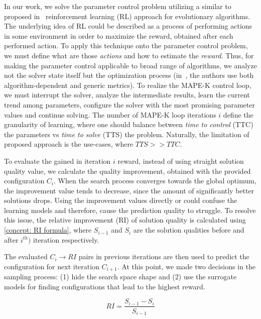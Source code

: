 In our work, we solve the parameter control problem utilizing a similar to proposed in~\cite{karafotias2014generic} reinforcement learning (RL) approach for evolutionary algorithms.
The underlying idea of RL could be described as a process of performing actions in some environment in order to maximize the reward, obtained after each performed action. To apply this technique onto the parameter control problem, we must define what are those \emph{actions} and how to estimate the \emph{reward}. Thus, for making the parameter control applicable to broad range of algorithms, we analyze not the solver state itself but the optimization process (in~\cite{karafotias2014generic}, the authors use both algorithm-dependent and generic metrics). To realize the MAPE-K control loop, we must interrupt the solver, analyze the intermediate results, learn the current trend among parameters, configure the solver with the most promising parameter values and continue solving. The number of MAPE-K loop iterations $i$ define the granularity of learning, where one should balance between \emph{time to control} (TTC) the parameters vs \emph{time to solve} (TTS) the problem. Naturally, the limitation of proposed approach is the use-cases, where $TTS >> TTC$.


To evaluate the gained in iteration $i$ reward, instead of using straight solution quality value, we calculate the quality improvement, obtained with the provided configuration $C_i$. When the search process converges towards the global optimum, the improvement value tends to decrease, since the amount of significantly better solutions drops. Using the improvement values directly or could confuse the learning models and therefore, cause the prediction quality to struggle. To resolve this issue, the relative improvement (RI) of solution quality is calculated using \cref{concept: RI formula}, where $S_{i-1}$ and $S_i$ are the solution qualities before and after $i^{th})$ iteration respectively.

The evaluated $C_i \rightarrow RI$ pairs in previous iterations are then used to predict the configuration for next iteration $C_{i+1}$. At this point, we made two decisions in the sampling process: (1) hide the search space shape and (2) use the surrogate models for finding configurations that lead to the highest reward.

\begin{equation}
RI = \frac{S_{i-1} - S_{i}}{S_{i-1}}
\label{concept: RI formula}
\end{equation}

